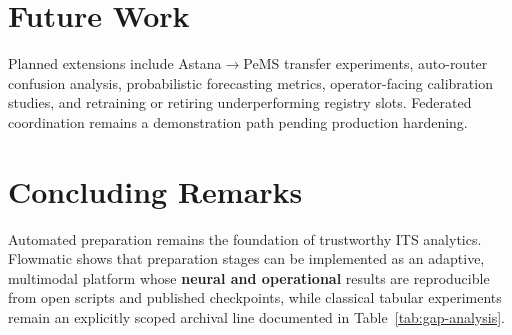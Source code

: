 \section{Future Work}

Planned extensions include Astana$\rightarrow$PeMS transfer experiments, auto-router confusion analysis, probabilistic forecasting metrics, operator-facing calibration studies, and retraining or retiring underperforming registry slots. Federated coordination remains a demonstration path pending production hardening.

\section{Concluding Remarks}

Automated preparation remains the foundation of trustworthy ITS analytics. Flowmatic shows that preparation stages can be implemented as an adaptive, multimodal platform whose \textbf{neural and operational} results are reproducible from open scripts and published checkpoints, while classical tabular experiments remain an explicitly scoped archival line documented in Table~\ref{tab:gap-analysis}.
